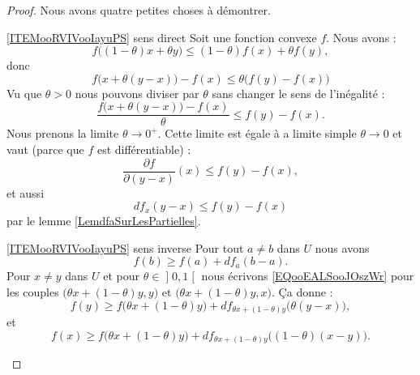\begin{proof}
    Nous avons quatre petites choses à démontrer.
    \begin{subproof}
    \item[\ref{ITEMooRVIVooIayuPS} sens direct]
        Soit une fonction convexe \( f\). Nous avons :
        \begin{equation}
            f\big( (1-\theta)x+\theta y \big)\leq (1-\theta)f(x)+\theta f(y),
        \end{equation}
        donc
        \begin{equation}
            f\big( x+\theta(y-x) \big)-f(x)\leq \theta\big( f(y)-f(x) \big)
        \end{equation}
        Vu que \( \theta>0\) nous pouvons diviser par \( \theta\) sans changer le sens de l'inégalité :
        \begin{equation}        \label{EQooAXXFooHWtiJh}
            \frac{ f\big( x+\theta(y-x) \big)-f(x) }{ \theta }\leq f(y)-f(x).
        \end{equation}
        Nous prenons la limite \( \theta\to 0^+\). Cette limite est égale à a limite simple \( \theta\to 0\) et vaut (parce que \( f\) est différentiable) :
        \begin{equation}
            \frac{ \partial f }{ \partial (y-x) }(x)\leq f(y)-f(x),
        \end{equation}
        et aussi
        \begin{equation}
            df_x(y-x)\leq f(y)-f(x)
        \end{equation}
        par le lemme \ref{LemdfaSurLesPartielles}.
    \item[\ref{ITEMooRVIVooIayuPS} sens inverse]
        Pour tout \( a\neq b\) dans \( U\) nous avons
        \begin{equation}        \label{EQooEALSooJOszWr}
            f(b)\geq f(a)+df_a(b-a).
        \end{equation}
    Pour \( x\neq y\) dans \( U\) et pour \( \theta\in\mathopen] 0 , 1 \mathclose[\) nous écrivons \eqref{EQooEALSooJOszWr} pour les couples \( \big( \theta x+(1-\theta)y,y \big)\) et \( \big( \theta x+(1-\theta)y,x \big)\). Ça donne :
        \begin{equation}
            f(y)\geq f\big( \theta x+(1-\theta)y \big)+df_{\theta x+(1-\theta)y}\big( \theta(y-x) \big),
        \end{equation}
        et
        \begin{equation}
            f(x)\geq f\big( \theta x+(1-\theta)y \big)+df_{\theta x+(1-\theta)y}\big( (1-\theta)(x-y) \big).

\end{equation}
\end{subproof}
\end{proof}
